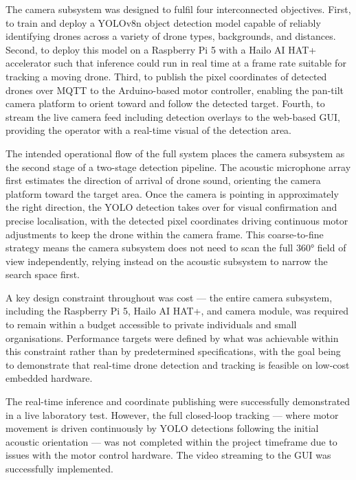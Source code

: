 The camera subsystem was designed to fulfil four interconnected objectives. 
First, to train and deploy a YOLOv8n object detection model capable of 
reliably identifying drones across a variety of drone types, backgrounds, 
and distances. Second, to deploy this model on a Raspberry Pi 5 with a 
Hailo AI HAT+ accelerator such that inference could run in real time at 
a frame rate suitable for tracking a moving drone. Third, to publish the 
pixel coordinates of detected drones over MQTT to the Arduino-based motor 
controller, enabling the pan-tilt camera platform to orient toward and 
follow the detected target. Fourth, to stream the live camera feed 
including detection overlays to the web-based GUI, providing the 
operator with a real-time visual of the detection area.

The intended operational flow of the full system places the camera 
subsystem as the second stage of a two-stage detection pipeline. The 
acoustic microphone array first estimates the direction of arrival of 
drone sound, orienting the camera platform toward the target area. 
Once the camera is pointing in approximately the right direction, 
the YOLO detection takes over for visual confirmation and precise 
localisation, with the detected pixel coordinates driving continuous 
motor adjustments to keep the drone within the camera frame. This 
coarse-to-fine strategy means the camera subsystem does not need 
to scan the full 360° field of view independently, relying instead 
on the acoustic subsystem to narrow the search space first.

A key design constraint throughout was cost — the entire camera 
subsystem, including the Raspberry Pi 5, Hailo AI HAT+, and camera 
module, was required to remain within a budget accessible to private 
individuals and small organisations. Performance targets were defined 
by what was achievable within this constraint rather than by 
predetermined specifications, with the goal being to demonstrate 
that real-time drone detection and tracking is feasible on low-cost 
embedded hardware.

The real-time inference and coordinate publishing were successfully 
demonstrated in a live laboratory test. However, the full closed-loop 
tracking — where motor movement is driven continuously by YOLO 
detections following the initial acoustic orientation — was not 
completed within the project timeframe due to issues with the motor 
control hardware. The video streaming to the GUI was successfully 
implemented.